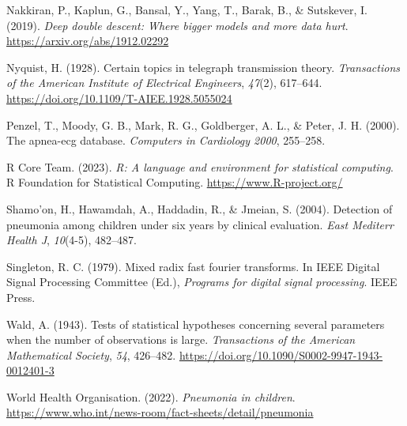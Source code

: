 \documentclass[
]{article}
\newlength{\cslhangindent}
\newlength{\cslentryspacingunit} %
\newenvironment{CSLReferences}[2] %
 {%
  \setlength{\parindent}{0pt}
  \ifodd #1
  \let\oldpar\par
  \def\par{\hangindent=\cslhangindent\oldpar}
  \fi
  \setlength{\parskip}{#2\cslentryspacingunit}
 }%
 {}
\begin{document}
\begin{CSLReferences}{1}{1}
\leavevmode{}%
Nakkiran, P., Kaplun, G., Bansal, Y., Yang, T., Barak, B., \& Sutskever,
I. (2019). \emph{Deep double descent: Where bigger models and more data
hurt}. \url{https://arxiv.org/abs/1912.02292}

\leavevmode{}%
Nyquist, H. (1928). Certain topics in telegraph transmission theory.
\emph{Transactions of the American Institute of Electrical Engineers},
\emph{47}(2), 617--644.
\url{https://doi.org/10.1109/T-AIEE.1928.5055024}

\leavevmode{}%
Penzel, T., Moody, G. B., Mark, R. G., Goldberger, A. L., \& Peter, J.
H. (2000). The apnea-ecg database. \emph{Computers in Cardiology 2000},
255--258.

\leavevmode{}%
R Core Team. (2023). \emph{R: A language and environment for statistical
computing}. R Foundation for Statistical Computing.
\url{https://www.R-project.org/}

\leavevmode{}%
Shamo'on, H., Hawamdah, A., Haddadin, R., \& Jmeian, S. (2004).
Detection of pneumonia among children under six years by clinical
evaluation. \emph{East Mediterr Health J}, \emph{10}(4-5), 482--487.

\leavevmode{}%
Singleton, R. C. (1979). Mixed radix fast fourier transforms. In IEEE
Digital Signal Processing Committee (Ed.), \emph{Programs for digital
signal processing}. IEEE Press.

\leavevmode{}%
Wald, A. (1943). Tests of statistical hypotheses concerning several
parameters when the number of observations is large. \emph{Transactions
of the American Mathematical Society}, \emph{54}, 426--482.
\url{https://doi.org/10.1090/S0002-9947-1943-0012401-3}

\leavevmode{}%
World Health Organisation. (2022). \emph{Pneumonia in children}.
\url{https://www.who.int/news-room/fact-sheets/detail/pneumonia}

\end{CSLReferences}
\end{document}
